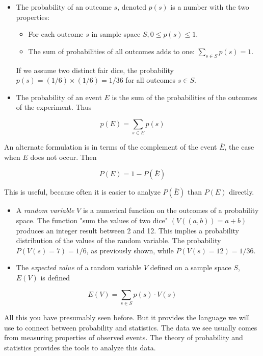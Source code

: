 \documentclass[10pt]{article}
\begin{document}
\begin{itemize}
    \item The probability of an outcome \(s\), denoted \(p(s)\) is a number with the two properties:
    \begin{itemize}
        \item For each outcome \(s\) in sample space \(S, 0 \leq p(s) \leq 1\).
        \item The sum of probabilities of all outcomes adds to one: \(\sum_{s \in S} p(s)=1\).
    \end{itemize}
    
    If we assume two distinct fair dice, the probability \(p(s)=(1 / 6) \times (1 / 6) = 1 / 36\) for all outcomes \(s \in S\).
    
    \item The probability of an event \(E\) is the sum of the probabilities of the outcomes of the experiment. Thus
\end{itemize}

\[ p(E)=\sum_{s \in E} p(s) \]

An alternate formulation is in terms of the complement of the event \(\bar{E}\), the case when \(E\) does not occur. Then

\[ P(E)=1-P(\bar{E}) \]

This is useful, because often it is easier to analyze \(P(\bar{E})\) than \(P(E)\) directly.

\begin{itemize}
    \item A \textit{random variable} \(V\) is a numerical function on the outcomes of a probability space. The function "sum the values of two dice" \((V((a, b))=a+b)\) produces an integer result between 2 and 12. This implies a probability distribution of the values of the random variable. The probability \(P(V(s)=7)=1 / 6\), as previously shown, while \(P(V(s)=12)=1 / 36\).
    
    \item The \textit{expected value} of a random variable \(V\) defined on a sample space \(S\), \(E(V)\) is defined
\end{itemize}

\[ E(V)=\sum_{s \in S} p(s) \cdot V(s) \]

All this you have presumably seen before. But it provides the language we will use to connect between probability and statistics. The data we see usually comes from measuring properties of observed events. The theory of probability and statistics provides the tools to analyze this data.
\end{document}
